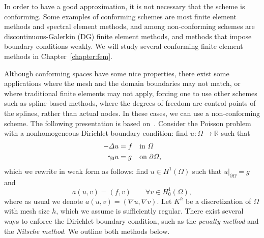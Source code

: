 In order to have a good approximation, it is not necessary that the scheme is conforming. Some examples of conforming schemes are most finite element methods and spectral element methods, and among non-conforming schemes are discontinuous-Galerkin (DG) finite element methods, and methods that impose boundary conditions weakly. We will study several conforming finite element methods in Chapter~\ref{chapter:fem}. 

Although conforming spaces have some nice properties, there exist some applications where the mesh and the domain boundaries may not match, or where traditional finite elements may not apply, forcing one to use other schemes such as spline-based methods, where the degrees of freedom are control points of the splines, rather than actual nodes. In these cases, we can use a non-conforming scheme. The following presentation is based on~\cite{Chouly2024}. Consider the Poisson problem with a nonhomogeneous Dirichlet boundary condition: find $u:\Omega\to \mathbb{R}$ such that
\begin{equation}
    \begin{aligned}
        -\Delta u &= f &&\text{in } \Omega \\
        \gamma_0 u &= g &&\text{on } \partial\Omega,
    \end{aligned}
\end{equation}
which we rewrite in weak form as follows: find $u\in H^1(\Omega)$ such that $u|_{\partial\Omega} = g$ and
\begin{equation}
    a(u,v) = (f,v) \qquad \forall v\in H_0^1(\Omega),
\end{equation}
where as usual we denote $a(u,v)=(\nabla u,\nabla v)$. Let $K^h$ be a discretization of $\Omega$ with mesh size $h$, which we assume is sufficiently regular. There exist several ways to enforce the Dirichlet boundary condition, such as the \emph{penalty method} and the \emph{Nitsche method}. We outline both methods below.
